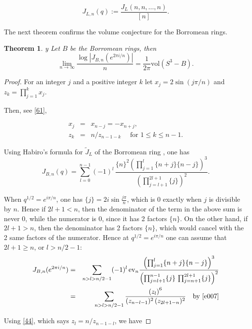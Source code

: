 \documentclass{amsart}
\newtheorem{theorem}{Theorem}[section]
\theoremstyle{definition}
\def\printname#1{
    \if\draft y
        \smash{\makebox[0pt]{\hspace{-0.5in}
            \raisebox{8pt}{\tt\tiny #1}}}
    \fi
}
\def\lbl#1{\label{#1}\printname{#1}}
\def\ev{\mathrm{ev}}
\def\vol{\mathrm{vol}}
\begin{document}
$$J_{L,n}(q) := \frac{J_L(n,n,\dots,n)}{[n]}.$$


The next theorem confirms the volume conjecture for the Borromean rings.

\begin{theorem}
\lbl{thm.borromean} Let $B$ be the Borromean rings, then
\begin{equation*}
\lim_{n \to \infty} \frac{\log|J_{B,n}(e^{2 \pi i/n})|}{n}
=\frac{1}{2 \pi} \vol(S^3-B).
\end{equation*}
\end{theorem}



\begin{proof}
For  an integer $j$ and a positive integer $k$
let $x_j= 2\sin(j\pi/n)$ and $z_k= \prod_{j=1}^{k} x_j$.

Then, see \eqref{61},

\begin{eqnarray}
x_j &=&x_{n-j} = - x_{n+j},
\label{e007}\\
    z_k &=& n/z_{n-1-k} \quad \text{ for $1\le
k\le n-1$}.
\label{44}\end{eqnarray}


Using  Habiro's formula for $\tilde J_L$ of the Borromean ring
\cite{H2,H1},  one has
$$
J_{B,n}(q)= \sum_{l=0}^{n-1}(-1)^l\, \frac{\{n\}^2 \left(
\prod_{j=1}^{l} \{n+j\}
\{n-j\}\right)^3}{\left(\prod_{j=l+1}^{2l+1}\{j\}\right)^2}.
$$

When $q^{1/2}= e^{i \pi/n}$, one has $\{j\}= 2i \sin \frac{j\pi}{n}$,
which is 0 exactly when $j$ is divisible by $n$. Hence if $2l+1 <n$,
then the denominator of the term in the above sum is never 0, while
the numerator is 0, since it has 2 factors $\{n\}$. On the other
hand, if $2l+1 >n$, then the denominator has 2 factors $\{n\}$,
which would cancel with the 2 same  factors of the numerator. Hence
at $q^{1/2}= e^{i \pi/n}$ one can assume that $2l +1 \ge n$, or $l>
n/2-1$:
\begin{eqnarray*}
J_{B,n}(e^{2 \pi i/n})&=& \sum_{n>l>n/2-1}(-1)^l\,\ev_n \frac{ \left(
\prod_{j=1}^{l} \{n+j\}
\{n-j\}\right)^3}{\left(\prod_{j=l+1}^{n-1}\{j\}\,
\prod_{j=n+1}^{2l+1}\{j\}\right)^2}\\
&=& \sum_{n>l>n/2-1} \frac{ \left(
z_l \right)^6}{( z_{n-l-1})^2\, (z_{2l+1-n})^2}\quad \text{by \eqref{e007}}
\end{eqnarray*}

Using  \eqref{44}, which says  $z_l = n/ z_{n-1-l}$, we have


\end{proof}
\end{document}
